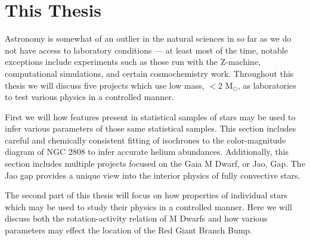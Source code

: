 \chapter{This Thesis}
Astronomy is somewhat of an outlier in the natural sciences in so far as we do
not have access to laboratory conditions --- at least most of the time, notable
exceptions include experiments such as those run with the Z-machine,
computational simulations, and certain cosmochemistry work. Throughout this
thesis we will discuss five projects which use low mass, $< 2$ M$_{\odot}$, as
laboratories to test various physics in a controlled manner.

First we will how features present in statistical samples of stars may be used
to infer various parameters of those same statistical samples. This section
includes careful and chemically consistent fitting of isochrones to the
color-magnitude diagram of NGC 2808 to infer accurate helium abundances.
Additionally, this section includes multiple projects focused on the Gaia M
Dwarf, or Jao, Gap. The Jao gap provides a unique view into the interior
physics of fully convective stars.

The second part of this thesis will focus on how properties of individual stars
which may be used to study their physics in a controlled manner. Here we will
discuss both the rotation-activity relation of M Dwarfs and how various
parameters may effect the location of the Red Giant Branch Bump. 
